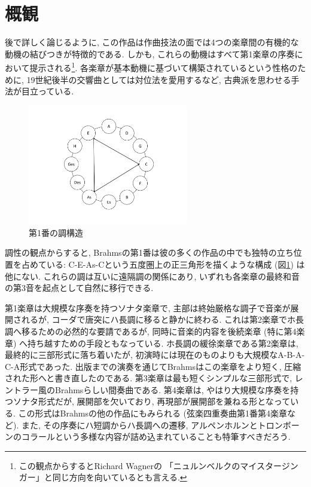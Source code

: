 
\section{概観}

後で詳しく論じるように, この作品は作曲技法の面では4つの楽章間の有機的な動機の結びつきが特徴的である.
しかも, これらの動機はすべて第1楽章の序奏において提示される\footnote{この観点からするとRichard Wagnerの
「ニュルンベルクのマイスタージンガー」と同じ方向を向いているとも言える.}.
各楽章が基本動機に基づいて構築されているという性格のために, 19世紀後半の交響曲としては対位法を愛用するなど, 古典派を思わせる手法が目立っている.
\begin{figure}
	\centering
	\includegraphics[clip,width=7.0cm]{./figure/modulatory.pdf}
	\caption{第1番の調構造}
	\label{modulatory}
\end{figure}
調性の観点からすると, Brahmsの第1番は彼の多くの作品の中でも独特の立ち位置を占めている:
C-E-As-Cという五度圏上の正三角形を描くような構成 (図\ref{modulatory}) は他にない.
これらの調は互いに遠隔調の関係にあり, いずれも各楽章の最終和音の第3音を起点として自然に移行できる\cite{ogt}.

第1楽章は大規模な序奏を持つソナタ楽章で, 主部は終始厳格な調子で音楽が展開されるが, コーダで唐突にハ長調に移ると静かに終わる.
これは第2楽章でホ長調へ移るための必然的な要請であるが, 同時に音楽的内容を後続楽章 (特に第4楽章) へ持ち越すための手段ともなっている.
ホ長調の緩徐楽章である第2楽章は, 最終的に三部形式に落ち着いたが, 初演時には現在のものよりも大規模なA-B-A-C-A形式であった.
出版までの演奏を通じてBrahmsはこの楽章をより短く, 圧縮された形へと書き直したのである.
第3楽章は最も短くシンプルな三部形式で, レントラー風のBrahmsらしい間奏曲である.
第4楽章は, やはり大規模な序奏を持つソナタ形式だが, 展開部を欠いており, 再現部が展開部を兼ねる形となっている.
この形式はBrahmsの他の作品にもみられる (弦楽四重奏曲第1番第4楽章など).
また, その序奏にハ短調からハ長調への遷移, アルペンホルンとトロンボーンのコラールという多様な内容が詰め込まれていることも特筆すべきだろう.

